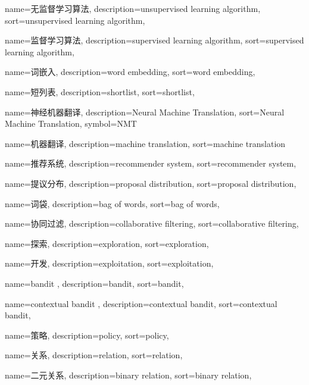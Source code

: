 {
  name=无监督学习算法,
  description={unsupervised learning algorithm},
  sort={unsupervised learning algorithm},
}

{
  name=监督学习算法,
  description={supervised learning algorithm},
  sort={supervised learning algorithm},
}

{
  name=词嵌入,
  description={word embedding},
  sort={word embedding},
}

{
  name=短列表,
  description={shortlist},
  sort={shortlist},
}

{
  name=神经机器翻译,
  description={Neural Machine Translation},
  sort={Neural Machine Translation},
  symbol={NMT}
}

{
  name=机器翻译,
  description={machine translation},
  sort={machine translation}
}

{
  name=推荐系统,
  description={recommender system},
  sort={recommender system},
}

{
  name=提议分布,
  description={proposal distribution},
  sort={proposal distribution},
}

{
  name=词袋,
  description={bag of words},
  sort={bag of words},
}

{
  name=协同过滤,
  description={collaborative filtering},
  sort={collaborative filtering},
}

{
  name=探索,
  description={exploration},
  sort={exploration},
}

{
  name=开发,
  description={exploitation},
  sort={exploitation},
}

{
  name=bandit ,
  description={bandit},
  sort={bandit},
}

{
  name=contextual bandit ,
  description={contextual bandit},
  sort={contextual bandit},
}

{
  name=策略,
  description={policy},
  sort={policy},
}

{
  name=关系,
  description={relation},
  sort={relation},
}

{
  name=二元关系,
  description={binary relation},
  sort={binary relation},
}

